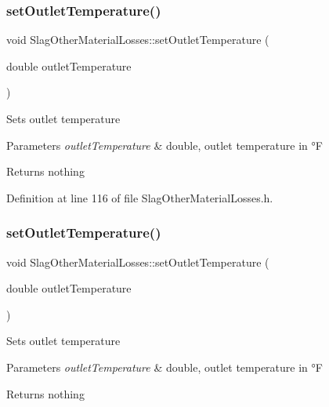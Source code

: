 \subsubsection{\texorpdfstring{set\+Outlet\+Temperature()}{setOutletTemperature()}\hspace{0.1cm}{\footnotesize\ttfamily [2/3]}}
{\footnotesize\ttfamily void Slag\+Other\+Material\+Losses\+::set\+Outlet\+Temperature (\begin{DoxyParamCaption}\item[{double}]{outlet\+Temperature }\end{DoxyParamCaption})\hspace{0.3cm}{\ttfamily [inline]}}

Sets outlet temperature


\begin{DoxyParams}{Parameters}
{\em outlet\+Temperature} & double, outlet temperature in °F\\
\hline
\end{DoxyParams}
\begin{DoxyReturn}{Returns}
nothing 
\end{DoxyReturn}


Definition at line 116 of file Slag\+Other\+Material\+Losses.\+h.

\mbox{\label{class_slag_other_material_losses_afae6aafff94d02926135fabf20a87070}} 
\subsubsection{\texorpdfstring{set\+Outlet\+Temperature()}{setOutletTemperature()}\hspace{0.1cm}{\footnotesize\ttfamily [3/3]}}
{\footnotesize\ttfamily void Slag\+Other\+Material\+Losses\+::set\+Outlet\+Temperature (\begin{DoxyParamCaption}\item[{double}]{outlet\+Temperature }\end{DoxyParamCaption})\hspace{0.3cm}{\ttfamily [inline]}}

Sets outlet temperature


\begin{DoxyParams}{Parameters}
{\em outlet\+Temperature} & double, outlet temperature in °F\\
\hline
\end{DoxyParams}
\begin{DoxyReturn}{Returns}
nothing 
\end{DoxyReturn}


